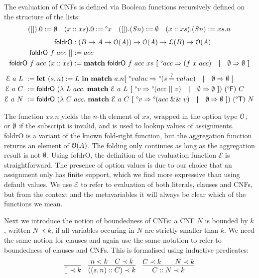 \documentclass[a4paper,UKenglish,cleveref, autoref]{lipics-v2019}
\begin{document}
The evaluation of CNFs is defined via Boolean functions recursively defined on the structure of the lists:
\begin{align*}
  ([]).0 := \emptyset && (x :: xs).0 := \degree x && ([]).(S n) := \emptyset && (x :: xs).(S n) := xs.n
\end{align*}
\vspace{-2em}
\begin{align*}
  \textsf{foldrO} &: (B \rightarrow A \rightarrow \mathcal{O}{(A)})  \rightarrow \mathcal{O}{(A)} \rightarrow \mathcal{L} (B) \rightarrow \mathcal{O}{(A)}\\ 
  \textsf{foldrO}~f~acc~[] &:= acc\\
  \textsf{foldrO}~f~acc~(x::xs) &:= \textbf{match}~ \textsf{foldrO}~f~acc~xs~\textbf{[}~ \degree acc \Rightarrow (f~x~acc) \quad\textbf{|}\quad \emptyset \Rightarrow \emptyset ~\textbf{]}
\end{align*}
\vspace{-2em}
\begin{align*}
  \mathcal{E}~a~L~ &:= \textbf{let}~ (s, n) := L~\textbf{in}~ \textbf{match}~ a.n \textbf{[}~ \degree value \Rightarrow \degree(s\overset{?}{=}value) \quad\textbf{|}\quad \emptyset \Rightarrow \emptyset ~\textbf{]} \\
  \mathcal{E}~a~C~ &:= \textsf{foldrO}~(\lambda~L~acc.~ \textbf{match}~ \mathcal{E}~a~L~ \textbf{[}~ \degree v \Rightarrow \degree(acc~||~v) \quad\textbf{|}\quad \emptyset \Rightarrow \emptyset~\textbf{]})~(\degree\mathsf{F})~C \\
  \mathcal{E}~a~N~ &:= \textsf{foldrO}~(\lambda~C~acc.~ \textbf{match}~ \mathcal{E}~a~C~ \textbf{[}~\degree v \Rightarrow \degree(acc~\&\&~v) \quad\textbf{|}\quad \emptyset \Rightarrow \emptyset~\textbf{]})~(\degree\mathsf{T})~N
\end{align*}

The function $xs.n$ yields the $n$-th element of $xs$, wrapped in the option type $\mathcal{O}{}$, or $\emptyset$ if the subscript is invalid, and is used to lookup values of assignments. \textsf{foldrO} is a variant of the known fold-right function, but the aggregation function returns an element of $\mathcal{O}{(A)}$. The folding only continues as long as the aggregation result is not $\emptyset$. 
Using \textsf{foldrO}, the definition of the evaluation function $\mathcal{E}$ is straightforward. The presence of option values is due to our choice that an assignment only has finite support, which we find more expressive than using default values. 
We use $\mathcal{E}$ to refer to evaluation of both literals, clauses and CNFs, but from the context and the metavariables it will always be clear which of the functions we mean.

Next we introduce the notion of boundedness of CNFs: a CNF $N$ is bounded by $k$, written $N \prec k$, if all variables occuring in $N$ are strictly smaller than $k$. We need the same notion for clauses and again use the same notation to refer to boundedness of clauses and CNFs. This is formalised using inductive predicates:
\begin{align*}
  \infer{[] \prec k}{} && \infer{((s, n) :: C) \prec k}{n < k \quad C \prec k} &&  \infer{C :: N \prec k}{C \prec k && N \prec k}
\end{align*}
\end{document}
